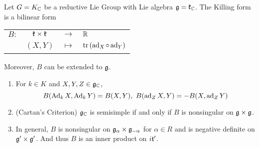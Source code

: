 \documentclass[a4paper,12pt]{article}
\begin{document}
	\begin{defn}
		Let $G=K_{\mathbb{C}}$ be a reductive Lie Group with Lie algebra $\mathfrak{g} = \mathfrak{k}_{\mathbb{C}}$. The Killing form is a bilinear form 
		\begin{center}
			\begin{tabular}{l c c l}
				$B \colon$ & $\mathfrak{k} \times \mathfrak{k}$ & $\longrightarrow$ & $\mathbb{R}$ \\
				~ & $(X,Y)$ & $\longmapsto$ & $\operatorname{tr}\left(\operatorname{ad}_X \circ \operatorname{ad}_Y\right)$
			\end{tabular}
		\end{center}
		Moreover, $B$ can be extended to $\mathfrak{g}$.
	\end{defn}

	\begin{thm}
		\begin{enumerate}
			\item For $k \in K$ and $X,Y,Z \in \mathfrak{g}_{\mathbb{C}}$,
			\begin{equation*}
				B(\operatorname{Ad}_kX,\operatorname{Ad}_kY) = B(X,Y),~B(\operatorname{ad}_ZX,Y) = -B(X,\operatorname{ad}_ZY)
			\end{equation*}
			\item (Cartan's Criterion) $\mathfrak{g}_{\mathbb{C}}$ is semisimple if and only if $B$ is nonsingular on $\mathfrak{g} \times \mathfrak{g}$.
			\item In general, $B$ is nonsingular on $\mathfrak{g}_{\alpha} \times \mathfrak{g}_{-\alpha}$ for $\alpha \in R$ and is negative definite on $\mathfrak{g}^{\prime} \times \mathfrak{g}^{\prime}$. And thus $B$ is an inner product on $i\mathfrak{t}^{\prime}$.
		\end{enumerate}
	\end{thm}
\end{document}
